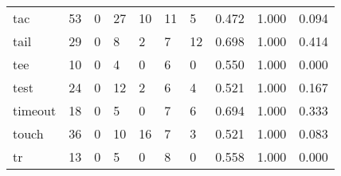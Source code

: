 \begin{longtable}{lp{1.3cm}p{1.3cm}p{1.3cm}p{1.3cm}p{1.3cm}p{1.3cm}p{1.3cm}p{1.3cm}p{1.3cm}}
tac       &                     53 &                                             0 &                                           27 &                                          10 &                                           11 &                                          5 &                                0.472 &                                  1.000 &                                0.094 \\
tail      &                     29 &                                             0 &                                            8 &                                           2 &                                            7 &                                         12 &                                0.698 &                                  1.000 &                                0.414 \\
tee       &                     10 &                                             0 &                                            4 &                                           0 &                                            6 &                                          0 &                                0.550 &                                  1.000 &                                0.000 \\
test      &                     24 &                                             0 &                                           12 &                                           2 &                                            6 &                                          4 &                                0.521 &                                  1.000 &                                0.167 \\
timeout   &                     18 &                                             0 &                                            5 &                                           0 &                                            7 &                                          6 &                                0.694 &                                  1.000 &                                0.333 \\
touch     &                     36 &                                             0 &                                           10 &                                          16 &                                            7 &                                          3 &                                0.521 &                                  1.000 &                                0.083 \\
tr        &                     13 &                                             0 &                                            5 &                                           0 &                                            8 &                                          0 &                                0.558 &                                  1.000 &                                0.000 \\

\end{longtable}
